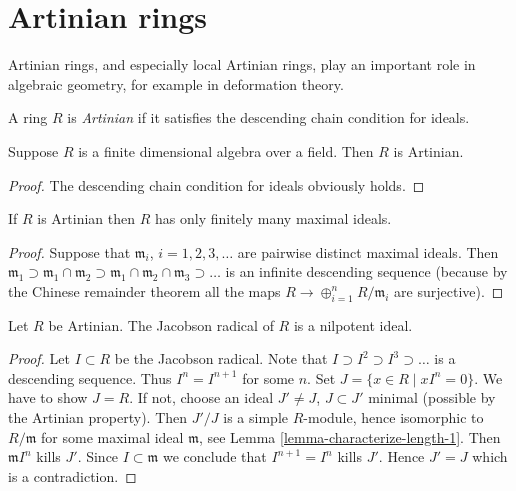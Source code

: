 \section{Artinian rings}
\label{section-artinian}

\noindent
Artinian rings, and especially local Artinian rings,
play an important role in algebraic geometry, for example
in deformation theory.

\begin{definition}
\label{definition-artinian}
A ring $R$ is {\it Artinian} if it satisfies the
descending chain condition for ideals.
\end{definition}

\begin{lemma}
\label{lemma-finite-dimensional-algebra}
Suppose $R$ is a finite dimensional algebra over a field.
Then $R$ is Artinian.
\end{lemma}

\begin{proof}
The descending chain condition for ideals obviously holds.
\end{proof}

\begin{lemma}
\label{lemma-artinian-finite-nr-max}
If $R$ is Artinian then $R$ has only finitely many maximal ideals.
\end{lemma}

\begin{proof}
Suppose that $\mathfrak m_i$, $i = 1, 2, 3, \ldots$ are
pairwise distinct maximal ideals.
Then $\mathfrak m_1 \supset \mathfrak m_1\cap \mathfrak m_2
\supset \mathfrak m_1 \cap \mathfrak m_2 \cap \mathfrak m_3 \supset \ldots$
is an infinite descending sequence (because by the Chinese
remainder theorem all the maps $R \to \oplus_{i = 1}^n R/\mathfrak m_i$
are surjective).
\end{proof}

\begin{lemma}
\label{lemma-artinian-radical-nilpotent}
Let $R$ be Artinian. The Jacobson radical of $R$ is a nilpotent ideal.
\end{lemma}

\begin{proof}
Let $I \subset R$ be the Jacobson radical.
Note that $I \supset I^2 \supset I^3 \supset \ldots$ is a descending
sequence. Thus $I^n = I^{n + 1}$ for some $n$.
Set $J = \{ x\in R \mid xI^n = 0\}$. We have to show $J = R$.
If not, choose an ideal $J' \not = J$, $J \subset J'$ minimal (possible
by the Artinian property). Then $J'/J$ is a simple $R$-module, hence
isomorphic to $R/\mathfrak m$ for some maximal ideal $\mathfrak m$,
see Lemma \ref{lemma-characterize-length-1}.
Then $\mathfrak m I^n$ kills $J'$. Since $I \subset \mathfrak m$
we conclude that $I^{n + 1} = I^n$ kills $J'$. Hence $J' = J$
which is a contradiction.
\end{proof}

